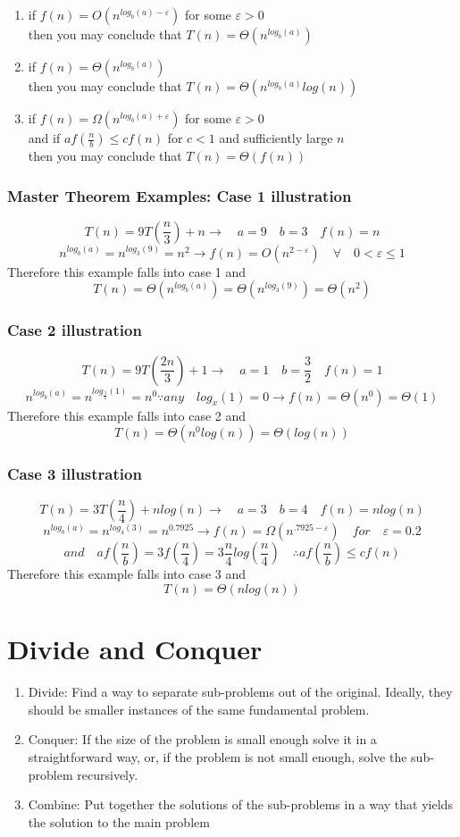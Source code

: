 \documentclass[12pt,letterpaper]{article}
\begin{document}
\begin{enumerate}
\item if $f(n)=O(n^{log_b(a)-\varepsilon})$ for some $\varepsilon > 0$\\
	then you may conclude that $T(n)=\Theta(n^{log_b(a)})$
\item if $f(n)=\Theta(n^{log_b(a)})$ \\
	then you may conclude that $T(n)=\Theta(n^{log_b(a)}log(n))$
\item if $f(n)=\Omega(n^{log_b(a)+\varepsilon})$ for some $\varepsilon > 0$ \\and if $af(\frac{n}{b})\le cf(n)$ for $c<1$ and sufficiently large $n$\\
	then you may conclude that $T(n)=\Theta(f(n))$ 
\end{enumerate}

\subsubsection{Master Theorem Examples: Case 1 illustration}
\[T(n)=9T(\frac{n}{3})+n  \to \quad a=9 \quad b=3 \quad f(n)=n\]
\[n^{log_b(a)}=n^{log_3(9)}=n^2 \to f(n)=O(n^{2-\varepsilon}) \quad \forall \quad 0 < \varepsilon \le 1 \]
Therefore this example falls into case 1 and
\[T(n)=\Theta(n^{log_b(a)})=\Theta(n^{log_3(9)})=\Theta(n^2)\]
\subsubsection{Case 2 illustration}
\[T(n)=9T(\frac{2n}{3})+1  \to \quad a=1 \quad b=\frac{3}{2} \quad f(n)=1\]
\[n^{log_b(a)}=n^{log_{\frac{3}{2}}(1)}=n^0 \because any \quad log_x(1)=0 \to f(n)=\Theta(n^0) =\Theta(1) \]
Therefore this example falls into case 2 and
\[T(n)=\Theta(n^0log(n))=\Theta(log(n))\]
\subsubsection{Case 3 illustration}
\[T(n)=3T(\frac{n}{4})+nlog(n)  \to \quad a=3 \quad b=4 \quad f(n)=nlog(n)\]
\[n^{log_b(a)}=n^{log_4(3)}=n^0.7925 \to f(n)=\Omega(n^{.7925-\varepsilon}) \quad for \quad \varepsilon = 0.2 \]
\[and \quad af(\frac{n}{b})=3f(\frac{n}{4})=3\frac{n}{4}log(\frac{n}{4}) \quad \therefore af(\frac{n}{b}) \le cf(n)\]
Therefore this example falls into case 3 and
\[T(n)=\Theta(nlog(n))\]
\section{Divide and Conquer}
\begin{enumerate}
\item Divide: Find a way to separate sub-problems out of the original. Ideally, they should be smaller instances of the same fundamental problem.
\item Conquer: If the size of the problem is small enough solve it in a straightforward way, or, if the problem is not small enough, solve the sub-problem recursively.
\item Combine: Put together the solutions of the sub-problems in a way that yields the solution to the main problem 
\end{enumerate}
\end{document}

